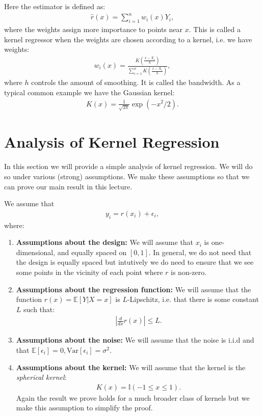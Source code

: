 \documentclass[twoside,12pt]{article}
\begin{document}
Here the estimator is defined as:
\begin{align*}
\widehat{r}(x) = \sum_{i=1}^n w_i(x) Y_i,
\end{align*}
where the weights assign more importance to points near $x$. This is called a kernel regressor
when the weights are chosen according to a kernel, i.e. we have weights:
\begin{align*}
w_i(x) = \frac{ K \left( \frac{x - X_i}{h} \right)}{\sum_{i=1}^n K \left( \frac{x - X_i}{h} \right) }, 
\end{align*}
where $h$ controls the amount of smoothing. It is called the bandwidth.
As a typical common example we have the Gaussian kernel:
\begin{align*}
K(x) = \frac{1}{\sqrt{2\pi}} \exp (- x^2/2).
\end{align*}

\section{Analysis of Kernel Regression}
In this section we will provide a simple analysis of kernel regression. 
We will do so under various (strong) assumptions. We
make these assumptions so that we can prove our main 
result in this lecture. 

We assume that 
\begin{align*}
y_i = r(x_i) + \epsilon_i,
\end{align*}
where:
\begin{enumerate}
\item {\bf Assumptions about the design: } We will assume that $x_i$ is one-dimensional,
and equally spaced on $[0,1]$. In general, we do not need that the design is equally 
spaced but intutively we do need to ensure that we 
see some points in the vicinity of each point where $r$ is non-zero. 

\item {\bf Assumptions about the regression function: } We will assume that the 
function $r(x) = \mathbb{E}[Y | X = x]$ is $L$-Lipschitz, i.e.
that there
is some constant $L$ such that:
\begin{align*}
\left\vert \frac{d}{dx} r(x) \right\vert \leq L.
\end{align*}
\item {\bf Assumptions about the noise: } We will assume that 
the noise is i.i.d and that $\mathbb{E}[\epsilon_i] = 0, \mathrm{Var}[\epsilon_i] = \sigma^2$. 
\item {\bf Assumptions about the kernel: } We will assume that the kernel is 
the \emph{spherical kernel}:
\begin{align*}
K(x) = \mathbb{I}(-1 \leq x \leq 1).
\end{align*}
Again the result we prove holds for a much broader class of kernels but we
make this assumption to simplify the proof.
\end{enumerate}
\end{document}
